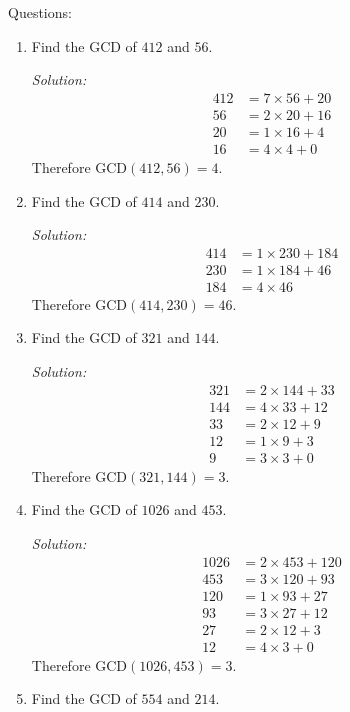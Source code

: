 \documentclass[16pt]{article}
\theoremstyle{remark}
\begin{document}
\newpage
Questions:
\begin{enumerate}
\item Find the GCD of $412$ and $56$.
\begin{mdframed}[style=TheoremFrame]
\textit{Solution:}
\begin{align*}
412 &= 7 \times 56 + 20\\
56 &= 2 \times 20 + 16\\
20 &= 1 \times 16 + 4\\
16 &= 4 \times 4 + 0
\end{align*}
Therefore GCD$(412,56)=4$.
\end{mdframed}
\item Find the GCD of $414$ and $230$.
\begin{mdframed}[style=TheoremFrame]
\textit{Solution:}
\begin{align*}
414 &= 1 \times 230 + 184\\
230 &= 1\times 184 + 46\\
184 &= 4 \times 46
\end{align*}
Therefore GCD$(414,230)=46$.
\end{mdframed}
\item Find the GCD of $321$ and $144$.
\begin{mdframed}[style=TheoremFrame]
\textit{Solution:}
\begin{align*}
321 &= 2 \times 144 + 33\\
144 &= 4 \times 33 + 12\\
33 &= 2 \times 12 + 9\\
12 &= 1 \times 9 + 3\\
9 &= 3 \times 3 + 0
\end{align*}
Therefore GCD$(321,144)=3$.
\end{mdframed}
\newpage
\item Find the GCD of $1026$ and $453$.
\begin{mdframed}[style=TheoremFrame]
\textit{Solution:}
\begin{align*}
1026 &= 2 \times 453 + 120\\
453 &= 3 \times 120 + 93\\
120 &= 1 \times 93 + 27\\
93 &= 3 \times 27 + 12\\
27 &= 2 \times 12 + 3\\
12 &= 4 \times 3 + 0
\end{align*}
Therefore GCD$(1026,453)=3$.
\end{mdframed}
\item Find the GCD of $554$ and $214$.

\end{enumerate}
\end{document}
